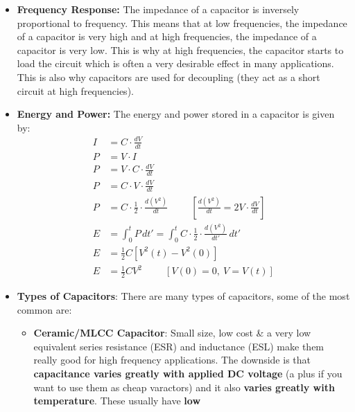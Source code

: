 \begin{itemize}
    You'll notice when we apply KCL to circuits within this book,
    we'll mostly use admittance \(Y\) to express the impedance, we
    do this as it simplifies the analysis a lot. The admittance
    version of Ohm's law is:
    \[
      I = V \cdot Y
    \]
  \item \textbf{Frequency Response:}
    The impedance of a capacitor is inversely proportional to
    frequency. This means that at low frequencies, the impedance
    of a capacitor is very high and at high frequencies, the impedance
    of a capacitor is very low. This is why at high frequencies,
    the capacitor starts to load the circuit which is often a
    very desirable effect in many applications. This is also why
    capacitors are used for decoupling (they act as a short
    circuit at high frequencies).
  \item \textbf{Energy and Power:}
    The energy and power stored in a capacitor is given by:
    \begin{align*}
      I &= C \cdot \frac{dV}{dt} \\
      P &= V \cdot I \\
      P &= V \cdot C \cdot \frac{dV}{dt} \\
      P &= C \cdot V \cdot \frac{dV}{dt} \\
      P &= C \cdot \frac{1}{2} \cdot \frac{d(V^2)}{dt} \hspace{1cm} [\frac{d(V^2)}{dt} = 2V \cdot \frac{dV}{dt}] \\
      E &= \int_0^t P \, dt' = \int_0^t C \cdot \frac{1}{2} \cdot \frac{d(V^2)}{dt'} \, dt' \\
      E &= \frac{1}{2} C \left[ V^2(t) - V^2(0) \right] \\
      E &= \frac{1}{2} C V^2 \hspace{1cm} [V(0) = 0,\ V = V(t)]
    \end{align*}
  \item \textbf{Types of Capacitors}:
    There are many types of capacitors, some of the most common are:
        \begin{itemize}
      \item \textbf{Ceramic/MLCC Capacitor}: Small size, low cost \& a
        very low equivalent series resistance (ESR) and inductance (ESL) make
        them really good for high frequency applications. The downside
        is that \textbf{capacitance varies greatly with applied DC voltage} (a plus
        if you want to use them as cheap varactors) and it also
        \textbf{varies greatly with temperature}. These usually have \textbf{low
}
\end{itemize}
\end{itemize}
